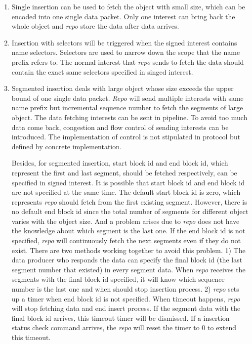 \documentclass[conference]{IEEEtran}
\begin{document}
\begin{enumerate}
\item Single insertion can be used to fetch the object with small size, which can be encoded into one single data packet. Only one interest can bring back the whole object and \emph{repo} store the data after data arrives.
\item Insertion with selectors will be triggered when the signed interest contains name selectors. Selectors are used to narrow down the scope that the name prefix refers to. The normal interest that \emph{repo} sends to fetch the data should contain the exact same selectors specified in singed interest.
\item Segmented insertion deals with large object whose size exceeds the upper bound of one single data packet. \emph{Repo} will send multiple interests with same name prefix but incremental sequence number to fetch the segments of large object. The data fetching interests can be sent in pipeline. To avoid too much data come back, congestion and flow control of sending interests can be introduced. The implementation of control is not stipulated in protocol but defined by concrete implementation.

    Besides, for segmented insertion, start block id and end block id, which represent the first and last segment, should be fetched respectively, can be specified in signed interest. It is possible that start block id and end block id are not specified at the same time. The default start block id is zero, which represents \emph{repo} should fetch from the first existing segment. However, there is no default end block id since the total number of segments for different object varies with the object size. And a problem arises due to \emph{repo} does not have the knowledge about which segment is the last one. If the end block id is not specified, \emph{repo} will continuously fetch the next segments even if they do not exist. There are two methods working together to avoid this problem. 1) The data producer who responds the data can specify the final block id (the last segment number that existed) in every segment data. When \emph{repo} receives the segments with the final block id specified, it will know which sequence number is the last one and when should stop insertion process. 2) \emph{repo} sets up a timer when end block id is not specified. When timeout happens, \emph{repo} will stop fetching data and end insert process. If the segment data with the final block id arrives, this timeout timer will be dismissed. If a insertion status check command arrives, the \emph{repo} will reset the timer to 0 to extend this timeout.
\end{enumerate}
\end{document}
